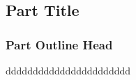 \begin{parttext}

\begin{frontmatter}
\part{Part Title}\label{part1}
\subtitle{Part Subtitle}

\author{Part Author}

\makeparttitle


\end{frontmatter}




\section{Part Outline Head}\label{part1:sec1}

ddddddddddddddddddddddd
\end{parttext}
